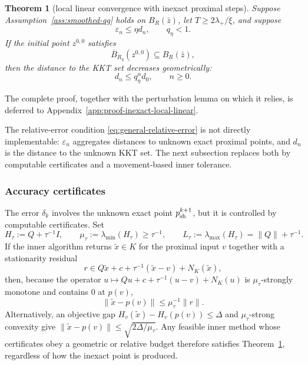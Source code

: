 \documentclass[letterpaper]{article} %
\newtheorem{theorem}{Theorem}[section] %
\theoremstyle{definition}
\theoremstyle{remark}
\begin{document}
\begin{theorem}[local linear convergence with inexact proximal steps]
\label{thm:inexact-local-linear}
Suppose Assumption~\ref{ass:smoothed-qg} holds on $B_R(\bar z)$, let
$T\ge2\lambda_+/\xi$, and suppose
\begin{equation}
\label{eq:general-relative-error}
    \varepsilon_n\le\eta d_n,
    \qquad
    q_\eta<1.
\end{equation}
\label{eq:rh-relative-epoch-error}
If the initial point $z^{0,0}$ satisfies
\begin{equation}
\label{eq:inexact-retention-ball}
    \overline B_{R_\eta}(z^{0,0})
    \subseteq
    B_R(\bar z),
\end{equation}
then the distance to the KKT set decreases geometrically:
\begin{equation}
\label{eq:general-relative-rate}
    d_n\le q_\eta^n d_0,
    \qquad n\ge0.
\end{equation}
\end{theorem}

The complete proof, together with the perturbation lemma on which it relies,
is deferred to Appendix~\ref{app:proof-inexact-local-linear}.

The relative-error condition \eqref{eq:general-relative-error} is not
directly implementable: $\varepsilon_n$ aggregates distances to unknown
exact proximal points, and $d_n$ is the distance to the unknown KKT set.
The next subsection replaces both by computable certificates and a
movement-based inner tolerance.

\subsubsection{Accuracy certificates}

The error $\delta_k$ involves the unknown exact point $p_{\rm sh}^{k+1}$,
but it is controlled by computable certificates.  Set
\[
    H_\tau:=Q+\tau^{-1}I,
    \qquad
    \mu_\tau:=\lambda_{\min}(H_\tau) \geq \tau^{-1},
    \qquad
    L_\tau:=\lambda_{\max}(H_\tau) = \|Q\| + \tau^{-1}.
\]
If the inner algorithm returns $\widetilde x\in K$ for the proximal input
$v$ together with a stationarity residual
\begin{equation}
\label{eq:general-stationarity-residual}
    r
    \in
    Q\widetilde x+c+\tau^{-1}(\widetilde x-v)+N_K(\widetilde x),
\end{equation}
then, because the operator
$u\mapsto Qu+c+\tau^{-1}(u-v)+N_K(u)$ is $\mu_\tau$-strongly monotone and
contains $0$ at $p(v)$,
\begin{equation}
\label{eq:general-residual-to-error}
    \|\widetilde x-p(v)\|
    \le
    \mu_\tau^{-1}\|r\|.
\end{equation}
Alternatively, an objective gap $H_v(\widetilde x)-H_v(p(v))\le\Delta$ and
$\mu_\tau$-strong convexity give
$\|\widetilde x-p(v)\|\le\sqrt{2\Delta/\mu_\tau}$.  Any feasible inner
method whose certificates obey a geometric or relative budget therefore
satisfies Theorem~\ref{thm:inexact-local-linear}, regardless of how the
inexact point is produced.
\end{document}
